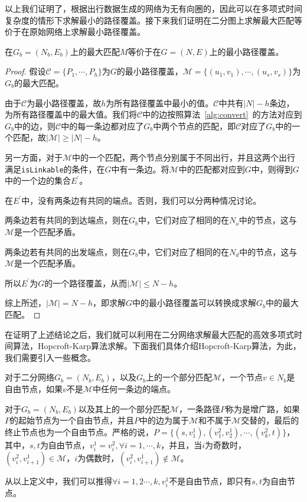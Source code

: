 \par
以上我们证明了，根据出行数据生成的网络为无有向圈的，因此可以在多项式时间复杂度的情形下求解最小的路径覆盖。接下来我们证明在二分图上求解最大匹配等价于在原始网络上求解最小路径覆盖。
\begin{theorem}
在$G_b = (N_b,E_b)$上的最大匹配$M$等价于在$G = (N,E)$上的最小路径覆盖。
\end{theorem}
\begin{proof}
假设$\mathcal{C} = \{P_1,\cdots, P_h\}$为$G$的最小路径覆盖，$\mathcal{M} = \{(u_1,v_1),\cdots, (u_s, v_s)\}$为$G_b$的最大匹配。
\par
由于$\mathcal{C}$为最小路径覆盖，故$h$为所有路径覆盖中最小的值。$\mathcal{C}$中共有$|N| - h$条边，为所有路径覆盖中的最大值。我们将$\mathcal{C}$中的边按照算法~\ref{alg:convert}~的方法对应到$G_b$中的边，则$\mathcal{C}$中的每一条边都对应了$G_b$中两个节点的匹配，即$\mathcal{C}$对应了$G_b$中的一个匹配，故$|\mathcal{M}| \geq |N| - h$。
\par
另一方面，对于$\mathcal{M}$中的一个匹配，两个节点分别属于不同出行，并且这两个出行满足\texttt{isLinkable}的条件，在$G$中有一条边。将$\mathcal{M}$中的匹配都对应到$G$中，则得到$G$中的一个边的集合$E^\prime$。
\par
在$E^\prime$中，没有两条边有共同的端点。否则，我们可以分两种情况讨论。
\par
两条边若有共同的到达端点，则在$G_b$中，它们对应了相同的在$N_o$中的节点，这与$\mathcal{M}$是一个匹配矛盾。
\par
两条边若有共同的出发端点，则在$G_b$中，它们对应了相同的在$N_d$中的节点，这与$\mathcal{M}$是一个匹配矛盾。
\par
所以$E^\prime$为$G$的一个路径覆盖，从而$ |\mathcal{M}|\leq N-h$。
\par
综上所述，$|\mathcal{M}| = N - h$，即求解$G$中的最小路径覆盖可以转换成求解$G_b$中的最大匹配。
\end{proof}

\par
在证明了上述结论之后，我们就可以利用在二分网络求解最大匹配的高效多项式时间算法，Hopcroft-Karp算法求解。下面我们具体介绍Hopcroft-Karp算法，为此，我们需要引入一些概念。
\begin{definition}[自由节点]
对于二分网络$G_b = (N_b, E_b)$，以及$G_b$上的一个部分匹配$\mathcal{M}$，一个节点$v\in N_b$是自由节点，如果$v$不是$\mathcal{M}$中任何一条边的端点。
\end{definition}

\begin{definition}[增广路]
对于$G_b = (N_b,E_b)$以及其上的一个部分匹配$\mathcal{M}$，一条路径$P$称为是增广路，如果$P$的起始节点为一个自由节点，并且$P$中的边为属于$\mathcal{M}$和不属于$\mathcal{M}$交替的，最后的终止节点也为一个自由节点。严格的说，$P = \{(s,v_1^1), (v_1^2, v_2^1),\cdots, (v_k^2, t)\}$，其中，$s,t$为自由节点，$v_i^1 = v_i^2, \forall i = 1,\cdots,k$，并且，当$i$为奇数时，$(v_i^2, v_{i+1}^1)\in \mathcal{M}$，$i$为偶数时，$(v_i^2, v_{i+1}^1)\notin \mathcal{M}$。
\end{definition}
\par
从以上定义中，我们可以推得$\forall i=1,2\cdots,k,v_i^1$不是自由节点，即只有$s,t$为自由节点。


